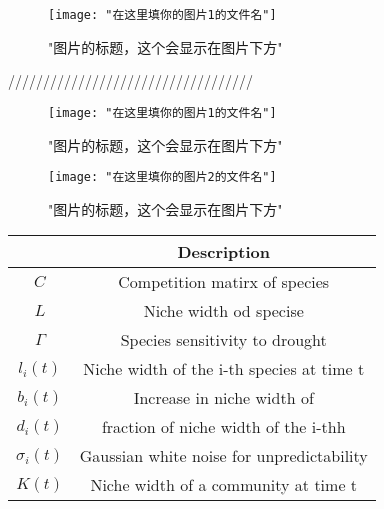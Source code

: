 \begin{figure}[H]
	\texttt{[image: "在这里填你的图片1的文件名"]}
	\centering
	\label{"可以和caption保持一致，也可以不写"}
	\caption{"图片的标题，这个会显示在图片下方"}
	\centering
\end{figure}
///////////////////////////////////
\begin{figure}[H]
	\begin{minipage}{0.5\textwidth}
		\texttt{[image: "在这里填你的图片1的文件名"]}
		\caption{"图片的标题，这个会显示在图片下方"}
		\label{"可以和caption保持一致，也可以不写"}
	\end{minipage}
	\hfill
	\begin{minipage}{0.5\textwidth}
		\texttt{[image: "在这里填你的图片2的文件名"]}
		\caption{"图片的标题，这个会显示在图片下方"}
		\label{"可以和caption保持一致，也可以不写"}
	\end{minipage}
\end{figure}
\begin{table}[h]%
	\centering%
	\renewcommand\arraystretch{1.5}%
	\tabcolsep=2cm%
	\begin{tabular}{@{}cclll@{}}
		\toprule
		\centering{\textbf{Symbol}}               & \multicolumn{4}{c}{\textbf{Description}}                      \\ \midrule
		$C$                           & \multicolumn{4}{c}{Competition matirx of species}             \\
		$L$                           & \multicolumn{4}{c}{Niche width od specise}                    \\
		$\Gamma $                     & \multicolumn{4}{c}{Species sensitivity to drought}            \\
		${l_i}\left( t \right)$       & \multicolumn{4}{c}{Niche width of the i-th species at time t} \\
		${b_i}\left( t \right)$       & \multicolumn{4}{c}{Increase in niche width of }               \\
		${d_i}\left( t \right)$       & \multicolumn{4}{c}{fraction of niche width of the i-thh}      \\
		${\sigma _i}\left( t \right)$ & \multicolumn{4}{c}{Gaussian white noise for unpredictability} \\
		$K\left( t \right)$           & \multicolumn{4}{c}{Niche width of a community at time t}      \\
		\bottomrule
	\end{tabular}
\end{table}
